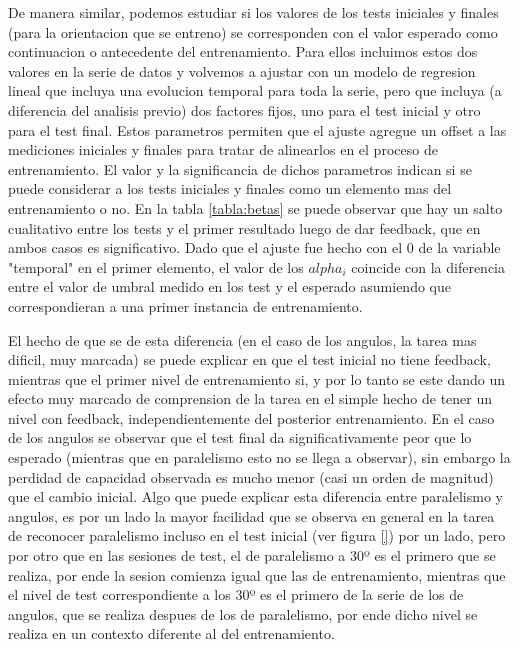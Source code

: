 \documentclass{article}
\begin{document}
De manera similar, podemos estudiar si los valores de los tests iniciales y finales (para la orientacion que se entreno) se corresponden con el valor esperado como continuacion o antecedente del entrenamiento. Para ellos incluimos estos dos valores en la serie de datos y volvemos a ajustar con un modelo de regresion lineal que incluya una evolucion temporal para toda la serie, pero que incluya (a diferencia del analisis previo) dos factores fijos, uno para el test inicial y otro para el test final. Estos parametros permiten que el ajuste agregue un offset a las mediciones iniciales y finales para tratar de alinearlos en el proceso de entrenamiento. El valor y la significancia de dichos parametros indican si se puede considerar a los tests iniciales y finales como un elemento mas del entrenamiento o no. En la tabla \ref{tabla:betas} se puede observar que hay un salto cualitativo entre los tests y el primer resultado luego de dar feedback, que en ambos casos es significativo. Dado que el ajuste fue hecho con el 0 de la variable "temporal" en el primer elemento, el valor de los $alpha_i$ coincide con la diferencia entre el valor de umbral medido en los test y el esperado asumiendo que correspondieran a una primer instancia de entrenamiento. 

El hecho de que se de esta diferencia (en el caso de los angulos, la tarea mas dificil, muy marcada) se puede explicar en que el test inicial no tiene feedback, mientras que el primer nivel de entrenamiento si, y por lo tanto se este dando un efecto muy marcado de comprension de la tarea en el simple hecho de tener un nivel con feedback, independientemente del posterior entrenamiento. En el caso de los angulos se observar que el test final da significativamente peor que lo esperado (mientras que en paralelismo esto no se llega a observar), sin embargo la perdidad de capacidad observada es mucho menor (casi un orden de magnitud) que el cambio inicial. Algo que puede explicar esta diferencia entre paralelismo y angulos, es por un lado la mayor facilidad que se observa en general en la tarea de reconocer paralelismo incluso en el test inicial (ver figura \ref{}) por un lado, pero por otro que en las sesiones de test, el de paralelismo a 30º es el primero que se realiza, por ende la sesion comienza igual que las de entrenamiento, mientras que el nivel de test correspondiente a los 30º es el primero de la serie de los de angulos, que se realiza despues de los de paralelismo, por ende dicho nivel se realiza en un contexto diferente al del entrenamiento. 
\end{document}
